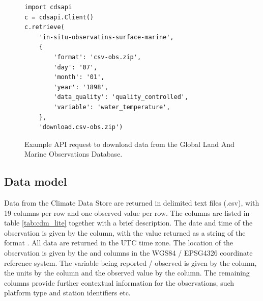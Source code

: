 
\begin{figure}
\begin{verbatim}
import cdsapi
c = cdsapi.Client()
c.retrieve(
    'in-situ-observatins-surface-marine',
    {
        'format': 'csv-obs.zip',
        'day': '07',
        'month': '01',
        'year': '1898',
        'data_quality': 'quality_controlled',
        'variable': 'water_temperature',
    },
    'download.csv-obs.zip')
\end{verbatim}
\caption{Example API request to download data from the Global Land And Marine Observations Database.\\}
\label{fig:cds_api}
\end{figure}


\FloatBarrier
\subsection{Data model}
\label{subsection:data_model}
Data from the Climate Data Store are returned in delimited text files (.csv), with 19 columns per row and one observed value per row. 
The columns are listed in table \ref{tab:cdm_lite} together with a brief description.  
The date and time of the observation is given by the  column, with the value returned as a string of the format . 
All data are returned in the UTC time zone.
The location of the observation is given by the  and  columns in the WGS84 / EPSG4326 coordinate reference system. 
The variable being reported / observed is given by the  column, the units by the  column and the observed value by the  column. 
The remaining columns provide further contextual information for the observations, such platform type and station identifiers etc. 

